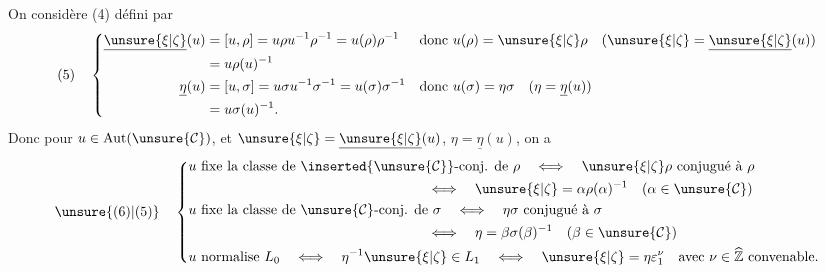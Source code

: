 On  considère
\hfill(4)
défini par
\[
(5)\quad
\left\{\begin{aligned}
\underline{\unsure{\xi|\zeta}}(u)&=[u,\rho]=u\rho u^{-1}\rho^{-1}=u(\rho)\rho^{-1}
&&\text{donc }u(\rho)=\unsure{\xi|\zeta}\rho\quad(\unsure{\xi|\zeta}=\underline{\unsure{\xi|\zeta}}(u))\\
&=u\rho(u)^{-1}\\
\underline{\eta}(u)&=[u,\sigma]=u\sigma u^{-1}\sigma^{-1}=u(\sigma)\sigma^{-1}
&&\text{donc }u(\sigma)=\eta\sigma\quad(\eta=\underline{\eta}(u))\\
&=u\sigma(u)^{-1}.
\end{aligned}\right.
\]
Donc pour $u\in\mathrm{Aut}(\unsure{\mathcal{C}})$, et $\unsure{\xi|\zeta}=\underline{\unsure{\xi|\zeta}}(u)$, $\eta=\underline{\eta}(u)$, on a
\[
\unsure{(6)|(5)}\quad
\left\{\begin{aligned}
&u\text{ fixe la classe de }\inserted{\unsure{\mathcal{C}}}\text{-conj. de }\rho
\quad\Longleftrightarrow\quad \unsure{\xi|\zeta}\rho\text{ conjugué à }\rho\\
&\hspace{6cm}\Longleftrightarrow\quad\unsure{\xi|\zeta}=\alpha\rho(\alpha)^{-1}\quad(\alpha\in\unsure{\mathcal{C}})\\
&u\text{ fixe la classe de }\unsure{\mathcal{C}}\text{-conj. de }\sigma
\quad\Longleftrightarrow\quad \eta\sigma\text{ conjugué à }\sigma\\
&\hspace{6cm}\Longleftrightarrow\quad\eta=\beta\sigma(\beta)^{-1}\quad(\beta\in\unsure{\mathcal{C}})\\
&u\text{ normalise }L_0\quad\Longleftrightarrow\quad\eta^{-1}\unsure{\xi|\zeta}\in L_1
\quad\Longleftrightarrow\quad\unsure{\xi|\zeta}=\eta\varepsilon_1^\nu\quad\text{avec }\nu\in\widehat{\mathbb Z}\text{ convenable}.
\end{aligned}\right.
\]

